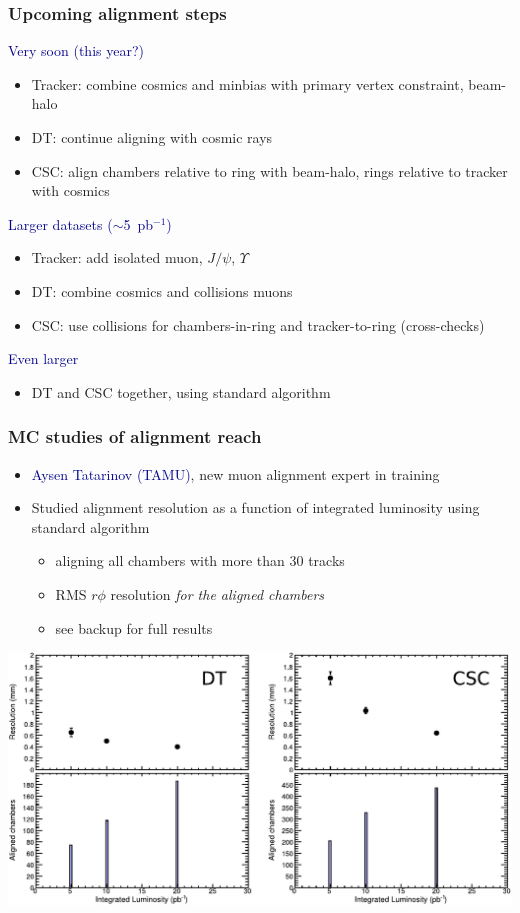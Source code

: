 \documentclass[compress]{beamer}
\begin{document}
\begin{frame}
\frametitle{Upcoming alignment steps}

\textcolor{darkblue}{\large Very soon (this year?)}

\begin{itemize}
\item Tracker: combine cosmics and minbias with primary vertex constraint, beam-halo
\item DT: continue aligning with cosmic rays
\item CSC: align chambers relative to ring with beam-halo, rings relative to tracker with cosmics
\end{itemize}

\textcolor{darkblue}{\large Larger datasets ($\sim$5~pb$^{-1}$)}

\begin{itemize}
\item Tracker: add isolated muon, $J/\psi$, $\Upsilon$
\item DT: combine cosmics and collisions muons
\item CSC: use collisions for chambers-in-ring and tracker-to-ring (cross-checks)
\end{itemize}

\textcolor{darkblue}{\large Even larger}

\begin{itemize}
\item DT and CSC together, using standard algorithm
\end{itemize}
\end{frame}

\begin{frame}
\frametitle{MC studies of alignment reach}
\begin{itemize}
\item \textcolor{darkblue}{Aysen Tatarinov (TAMU)}, new muon alignment expert in training

\item Studied alignment resolution as a function of integrated luminosity using standard algorithm
\begin{itemize}
\item aligning all chambers with more than 30 tracks
\item RMS $r\phi$ resolution {\it for the aligned chambers}
\item see backup for full results
\end{itemize}
\end{itemize}

\includegraphics[width=\linewidth]{aysens_results.pdf}
\end{frame}
\end{document}
